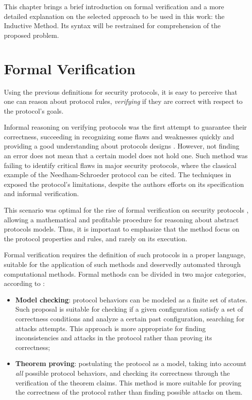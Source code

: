 \label{chap:inductive}
This chapter brings a brief introduction on formal verification and a more detailed explanation on the selected approach to be used in this work: the Inductive Method. Its syntax will be restrained for comprehension of the proposed problem.





\section{Formal Verification}
Using the previous definitions for security protocols, it is easy to perceive that one can reason about protocol rules, \textit{verifying} if they are correct with respect to the protocol's goals.

Informal reasoning on verifying protocols was the first attempt to guarantee their correctness, succeeding in recognizing some flaws and weaknesses quickly and providing a good understanding about protocols designs \cite{Bella2007}. However, not finding an error does not mean that a certain model does not hold one. Such method was failing to identify critical flaws in major security protocols, where the classical example of the Needham-Schroeder protocol \cite{NeedhamSchroeder78} can be cited. The techniques in \cite{Lowe96} exposed the protocol's limitations, despite the authors efforts on its specification and informal verification.

This scenario was optimal for the rise of formal verification on security protocols \cite{Meadows96, Meadows94, Kemmerer94, Burrows90}, allowing a mathematical and profitable procedure for reasoning about abstract protocols models. Thus, it is important to emphasize that the method focus on the protocol properties and rules, and rarely on its execution.

Formal verification requires the definition of such protocols in a proper language, suitable for the application of such methods and deservedly automated through computational methods. Formal methods can be divided in two major categories, according to \cite{BoydMathuria2008}:

\begin{itemize}
  \item \textbf{Model checking}: protocol behaviors can be modeled as a finite set of states. Such proposal is suitable for checking if a given configuration satisfy a set of correctness conditions and analyze a certain past configuration, searching for attacks attempts. This approach is more appropriate for finding inconsistencies and attacks in the protocol rather than proving its correctness;

  \item \textbf{Theorem proving}: postulating the protocol as a model, taking into account \textit{all} possible protocol behaviors, and checking its correctness through the verification of the theorem claims. This method is more suitable for proving the correctness of the protocol rather than finding possible attacks on them.
\end{itemize}

